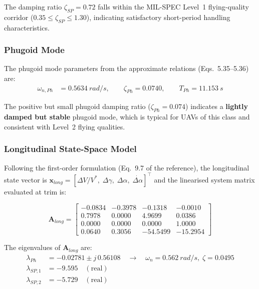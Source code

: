 The damping ratio $\zeta_{SP}=0.72$ falls within the MIL-SPEC Level~1 flying-quality corridor ($0.35 \le \zeta_{SP} \le 1.30$), indicating satisfactory short-period handling characteristics.

\subsubsection{Phugoid Mode}

The phugoid mode parameters from the approximate relations (Eqs.~5.35--5.36) are:
\begin{align}
  \omega_{n,Ph} &= \SI{0.5634}{rad/s}, \qquad
  \zeta_{Ph}    = 0.0740, \qquad
  T_{Ph}        = \SI{11.153}{s}
\end{align}

The positive but small phugoid damping ratio ($\zeta_{Ph} = 0.074$) indicates a \textbf{lightly damped but stable} phugoid mode, which is typical for UAVs of this class and consistent with Level~2 flying qualities.

\subsubsection{Longitudinal State-Space Model}

Following the first-order formulation (Eq.~9.7 of the reference), the longitudinal state vector is $\mathbf{x}_{long} = [\Delta V/V^*,\; \Delta\gamma,\; \Delta\alpha,\; \dot{\Delta\alpha}]^\top$ and the linearised system matrix evaluated at trim is:

\begin{equation}
  \mathbf{A}_{long} =
  \begin{bmatrix}
    -0.0834 & -0.3978 & -0.1318 & -0.0010 \\
     0.7978 &  0.0000 &  4.9699 &  0.0386 \\
     0.0000 &  0.0000 &  0.0000 &  1.0000 \\
     0.0640 &  0.3056 & -54.5499& -15.2954
  \end{bmatrix}
  \label{eq:Along}
\end{equation}

The eigenvalues of $\mathbf{A}_{long}$ are:
\begin{align}
  \lambda_{Ph}  &= -0.02781 \pm j\,0.56108
  \quad\rightarrow\quad \omega_{n} = \SI{0.562}{rad/s},\; \zeta = 0.0495 \\[3pt]
  \lambda_{SP,1}&= -9.595 \quad (\text{real}) \\
  \lambda_{SP,2}&= -5.729 \quad (\text{real})
\end{align}

